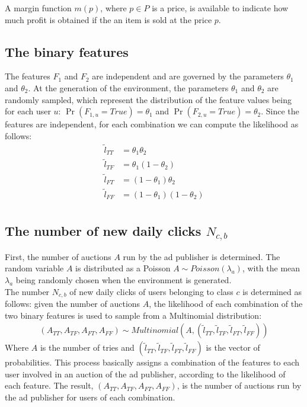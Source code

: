 \documentclass[11pt]{article} %
\begin{document}
A margin function $m(p)$, where $p \in P$ is a price, is available to indicate how much profit is obtained if the an item is sold at the price $p$. 

\subsection {The binary features}
The features $F_1$ and $F_2$ are independent and are governed by the parameters $\theta_1$ and $\theta_2$. At the generation of the environment, the parameters $\theta_1$ and $\theta_2$ are randomly sampled, which represent the distribution of the feature values being for each user $u$: $\Pr(F_{1,u}=True)=\theta_1$ and $\Pr(F_{2,u}=True)=\theta_2$. Since the features are independent, for each combination we can compute the likelihood as follows:
\begin{align*}
\tilde{l}_{TT} &= \theta_1\theta_2\\
\tilde{l}_{TF} &= \theta_1(1-\theta_2)\\
\tilde{l}_{FT} &= (1-\theta_1)\theta_2\\
\tilde{l}_{FF} &= (1-\theta_1)(1-\theta_2)\\
\end{align*}

\subsection{The number of new daily clicks $N_{c,b}$}
First, the number of auctions $A$ run by the ad publisher is determined. The random variable $A$ is distributed as a Poisson $A\sim Poisson(\lambda_a)$, with the mean $\lambda_a$ being randomly chosen when the environment is generated.\\

The number $N_{c,b}$ of new daily clicks of users belonging to class $c$ is determined as follows: given the number of auctions $A$, the likelihood of each combination of the two binary features is used to sample from a Multinomial distribution:
\begin{align*}
(A_{TT},A_{TF},A_{FT},A_{FF}) \sim Multinomial(A, (\tilde{l}_{TT},\tilde{l}_{TF},\tilde{l}_{FT},\tilde{l}_{FF}))
\end{align*}
Where $A$ is the number of tries and  $ (\tilde{l}_{TT},\tilde{l}_{TF},\tilde{l}_{FT},\tilde{l}_{FF})$ is the vector of probabilities. This process basically assigns a combination of the features to each user involved in an auction of the ad publisher, according to the likelihood of each feature. The result, $(A_{TT},A_{TF},A_{FT},A_{FF})$, is the number of auctions run by the ad publisher for users of each combination. 
\end{document}
